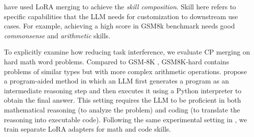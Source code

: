 \documentclass[10pt]{article} %
\begin{document}
    \cite{prabhakar2024lora} have used LoRA merging to achieve the \textit{skill
    composition}. Skill here refers to specific capabilities that the LLM needs for
    customization to downstream use cases. For example, achieving a high score in
    GSM8k benchmark \cite{cobbe2021training} needs good \textit{commonsense} and
    \textit{arithmetic} skills.


    To explicitly examine how reducing task interference, we evaluate CP merging on hard math word problems.
    Compared to GSM‑8K \citep{cobbe2021training}, GSM8K‑hard \citep{gao2023pal} contains
    problems of similar types but with more complex arithmetic operations.
    \citet{gao2023pal} propose a program‑aided method in which an LLM first generates
    a program as an intermediate reasoning step and then executes it using a Python
    interpreter to obtain the final answer. This setting requires the LLM to be
    proficient in both mathematical reasoning (to analyze the problem) and
    coding (to translate the reasoning into executable code). Following the same experimental setting in  \citet{prabhakar2024lora},
    we train separate LoRA adapters for math and code skills.
\end{document}
